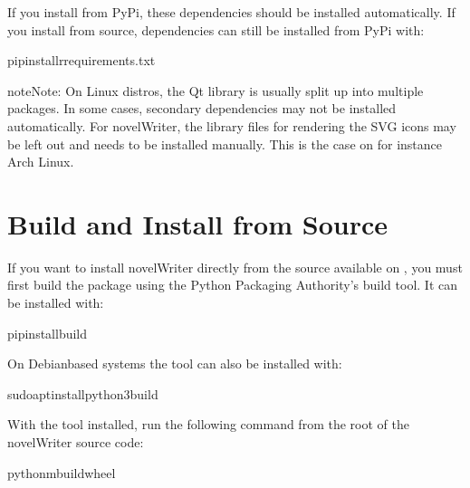 \documentclass[a4paper,11pt,english]{sphinxmanual}
\begin{document}
\sphinxAtStartPar
If you install from PyPi, these dependencies should be installed automatically. If you install from
source, dependencies can still be installed from PyPi with:

\begin{sphinxVerbatim}[commandchars=\\\{\}]
pipinstall\PYGZhy{}rrequirements.txt
\end{sphinxVerbatim}

\begin{sphinxadmonition}{note}{Note:}
\sphinxAtStartPar
On Linux distros, the Qt library is usually split up into multiple packages. In some cases,
secondary dependencies may not be installed automatically. For novelWriter, the library files
for rendering the SVG icons may be left out and needs to be installed manually. This is the
case on for instance Arch Linux.
\end{sphinxadmonition}


\section{Build and Install from Source}
\label{\detokenize{tech_source:build-and-install-from-source}}\label{\detokenize{tech_source:a-source-install}}
\sphinxAtStartPar
If you want to install novelWriter directly from the source available on , you must first
build the package using the Python Packaging Authority’s build tool. It can be installed with:

\begin{sphinxVerbatim}[commandchars=\\\{\}]
pipinstallbuild
\end{sphinxVerbatim}

\sphinxAtStartPar
On Debian\sphinxhyphen{}based systems the tool can also be installed with:

\begin{sphinxVerbatim}[commandchars=\\\{\}]
sudoaptinstallpython3\PYGZhy{}build
\end{sphinxVerbatim}

\sphinxAtStartPar
With the tool installed, run the following command from the root of the novelWriter source code:

\begin{sphinxVerbatim}[commandchars=\\\{\}]
python\PYGZhy{}mbuild\PYGZhy{}\PYGZhy{}wheel
\end{sphinxVerbatim}
\end{document}
